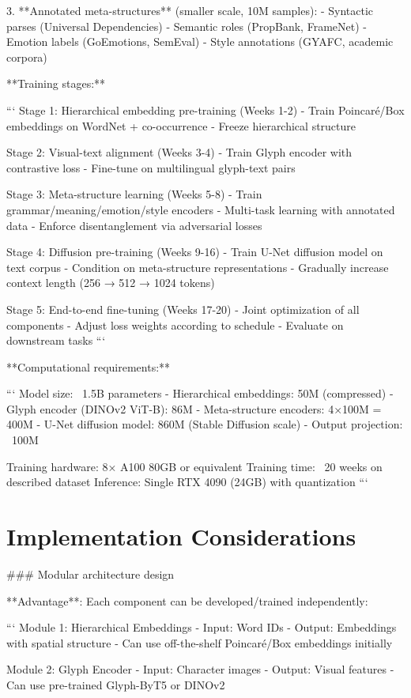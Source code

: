 \documentclass[11pt]{article}
\begin{document}
3. **Annotated meta-structures** (smaller scale, 10M samples):
   - Syntactic parses (Universal Dependencies)
   - Semantic roles (PropBank, FrameNet)
   - Emotion labels (GoEmotions, SemEval)
   - Style annotations (GYAFC, academic corpora)

**Training stages:**

```
Stage 1: Hierarchical embedding pre-training (Weeks 1-2)
- Train Poincaré/Box embeddings on WordNet + co-occurrence
- Freeze hierarchical structure

Stage 2: Visual-text alignment (Weeks 3-4)  
- Train Glyph encoder with contrastive loss
- Fine-tune on multilingual glyph-text pairs

Stage 3: Meta-structure learning (Weeks 5-8)
- Train grammar/meaning/emotion/style encoders
- Multi-task learning with annotated data
- Enforce disentanglement via adversarial losses

Stage 4: Diffusion pre-training (Weeks 9-16)
- Train U-Net diffusion model on text corpus
- Condition on meta-structure representations
- Gradually increase context length (256 → 512 → 1024 tokens)

Stage 5: End-to-end fine-tuning (Weeks 17-20)
- Joint optimization of all components
- Adjust loss weights according to schedule
- Evaluate on downstream tasks
```

**Computational requirements:**

```
Model size: ~1.5B parameters
- Hierarchical embeddings: 50M (compressed)
- Glyph encoder (DINOv2 ViT-B): 86M
- Meta-structure encoders: 4×100M = 400M
- U-Net diffusion model: 860M (Stable Diffusion scale)
- Output projection: ~100M

Training hardware: 8× A100 80GB or equivalent
Training time: ~20 weeks on described dataset
Inference: Single RTX 4090 (24GB) with quantization
```

\section{Implementation Considerations}

### Modular architecture design

**Advantage**: Each component can be developed/trained independently:

```
Module 1: Hierarchical Embeddings
- Input: Word IDs
- Output: Embeddings with spatial structure
- Can use off-the-shelf Poincaré/Box embeddings initially

Module 2: Glyph Encoder  
- Input: Character images
- Output: Visual features
- Can use pre-trained Glyph-ByT5 or DINOv2
\end{document}

